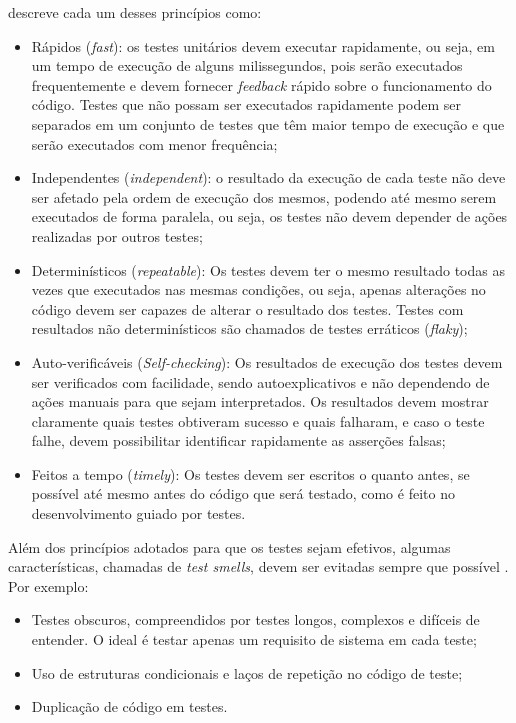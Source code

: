         \cite{Valente2020} descreve cada um desses princípios como:
        
        \begin{itemize}
            \item Rápidos (\emph{fast}): os testes unitários devem executar rapidamente, ou seja, em um tempo de execução de alguns milissegundos, pois serão executados frequentemente e devem fornecer \emph{feedback} rápido sobre o funcionamento do código. Testes que não possam ser executados rapidamente podem ser separados em um conjunto de testes que têm maior tempo de execução e que serão executados com menor frequência;
            \item Independentes (\emph{independent}): o resultado da execução de cada teste não deve ser afetado pela ordem de execução dos mesmos, podendo até mesmo serem executados de forma paralela, ou seja, os testes não devem depender de ações realizadas por outros testes;
            \item Determinísticos (\emph{repeatable}): Os testes devem ter o mesmo resultado todas as vezes que executados nas mesmas condições, ou seja, apenas alterações no código devem ser capazes de alterar o resultado dos testes. Testes com resultados não determinísticos são chamados de testes erráticos (\emph{flaky});
            \item Auto-verificáveis (\emph{Self-checking}): Os resultados de execução dos testes devem ser verificados com facilidade, sendo autoexplicativos e não dependendo de ações manuais para que sejam interpretados. Os resultados devem mostrar claramente quais testes obtiveram sucesso e quais falharam, e caso o teste falhe, devem possibilitar identificar rapidamente as asserções falsas;
            \item Feitos a tempo (\emph{timely}): Os testes devem ser escritos o quanto antes, se possível até mesmo antes do código que será testado, como é feito no desenvolvimento guiado por testes.
        \end{itemize}
        
        Além dos princípios adotados para que os testes sejam efetivos, algumas características, chamadas de \emph{test smells}, devem ser evitadas sempre que possível \cite{Valente2020}. Por exemplo:
        \begin{itemize}
            \item Testes obscuros, compreendidos por testes longos, complexos e difíceis de entender. O ideal é testar apenas um requisito de sistema em cada teste;
            \item Uso de estruturas condicionais e laços de repetição no código de teste;
            \item Duplicação de código em testes.
        \end{itemize}


